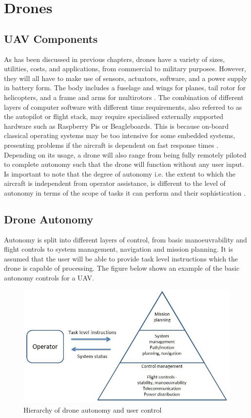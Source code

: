 \section{Drones}

\subsection{UAV Components}
As has been discussed in previous chapters, drones have a variety of sizes, utilities, costs, and applications, from commercial to military purposes. However, they will all have to make use of sensors, actuators, software, and a power supply in battery form. The body includes a fuselage and wings for planes, tail rotor for helicopters, and a frame and arms for multirotors \cite{mitchjohnson2015}. The combination of different layers of computer software with different time requirements, also referred to as the autopilot or flight stack, may require specialised externally supported hardware such as Raspberry Pis or Beagleboards. This is because on-board classical operating systems may be too intensive for some embedded systems, presenting problems if the aircraft is dependent on fast response times \cite{paparazzi2016}. 
Depending on its usage, a drone will also range from being fully remotely piloted to complete autonomy such that the drone will function without any user input. Is important to note that the degree of autonomy i.e. the extent to which the aircraft is independent from operator assistance, is different to the level of autonomy in terms of the scope of tasks it can perform and their sophistication \cite{williammarra2012}.

\subsection{Drone Autonomy}
Autonomy is split into different layers of control, from basic manoeuvrability and flight controls to system management, navigation and mission planning. It is assumed that the user will be able to provide task level instructions which the drone is capable of processing. The figure below shows an example of the basic autonomy controls for a UAV.

\begin{figure}
\centering	
\includegraphics[scale=0.4]{img/autopyra}	
\caption{Hierarchy of drone autonomy and user control}
\end{figure}

